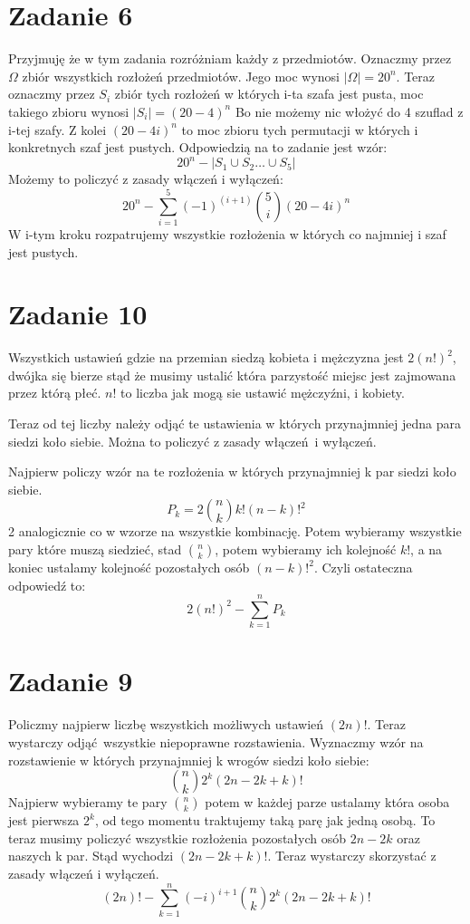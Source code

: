 \documentclass{article}
\begin{document}
\section*{Zadanie 6}
Przyjmuję że w tym zadania rozróżniam każdy z przedmiotów.
Oznaczmy przez $\Omega$ zbiór wszystkich rozłożeń przedmiotów. Jego moc wynosi $| \Omega | = 20^n$. 
Teraz oznaczmy przez $S_i$ zbiór tych rozłożeń w których i-ta szafa jest pusta, moc takiego zbioru wynosi $| S_i | = (20-4)^n$ Bo nie możemy nic włożyć do 4 szuflad z i-tej szafy. Z kolei $(20 - 4i)^n$ to moc zbioru tych permutacji w których i konkretnych szaf jest pustych. Odpowiedzią na to zadanie jest wzór:
\[ 20^n - |S_1 \cup S_2 \dots \cup S_5 | \]
Możemy to policzyć z zasady włączeń i wyłączeń:
\[ 20^n - \sum^5_{i=1} (-1)^(i+1) {5 \choose i} (20-4i)^n \]
W i-tym kroku rozpatrujemy wszystkie rozłożenia w których co najmniej i szaf jest pustych.


\section*{Zadanie 10}
Wszystkich ustawień gdzie na przemian siedzą kobieta i mężczyzna jest $2 (n!)^2$, dwójka się bierze stąd że musimy ustalić która parzystość miejsc jest zajmowana przez którą płeć. $n!$ to liczba jak mogą sie ustawić mężczyźni, i kobiety.

Teraz od tej liczby należy odjąć te ustawienia w których przynajmniej jedna para siedzi koło siebie. Można to policzyć z zasady włączeń i wyłączeń.

Najpierw policzy wzór na te rozłożenia w których przynajmniej k par siedzi koło siebie.
\[ P_k = 2 {n \choose k} k! (n-k)! ^2\]
2 analogicznie co w wzorze na wszystkie kombinację. Potem wybieramy wszystkie pary które muszą siedzieć, stad ${n \choose k}$, potem wybieramy ich kolejność $k!$, a na koniec ustalamy kolejność pozostałych osób $(n-k)! ^2$.
Czyli ostateczna odpowiedź to:
\[ 2 (n!)^2 - \sum^n_{k=1} P_k \]

\section*{Zadanie 9} 
Policzmy najpierw liczbę wszystkich możliwych ustawień
$(2n)!$. Teraz wystarczy odjąć wszystkie niepoprawne rozstawienia. Wyznaczmy wzór na rozstawienie w których przynajmniej k wrogów siedzi koło siebie:
\[ {n \choose k} 2^k (2n - 2k + k)! \]
Najpierw wybieramy te pary ${n \choose k}$ potem w każdej parze ustalamy która osoba jest pierwsza $2^k$, od tego momentu traktujemy taką parę jak jedną osobą. To teraz musimy policzyć wszystkie rozłożenia pozostałych osób $2n - 2k$ oraz naszych k par. Stąd wychodzi $(2n - 2k + k)!$.
\newline
Teraz wystarczy skorzystać z zasady włączeń i wyłączeń.
\[ (2n)! - \sum^n_{k=1} (-i)^{i+1} {n \choose k} 2^k (2n - 2k + k)! \]
\end{document}
